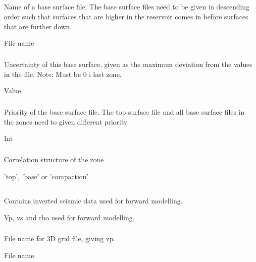 \subparagraph{}
 \slist
   \item \Description Name of a base surface file. The base surface files need to be given in descending order such that surfaces that are higher in the reservoir comes in before surfaces that are further down.
   \item \Argument File name
   \item \Default
 \elist

\subparagraph{}
 \slist
   \item \Description Uncertainty of this base surface, given as the maximum deviation from the values in the file. Note: Must be 0 i last zone.
   \item \Argument Value
 \elist

\subparagraph{}
 \slist
   \item \Description Priority of the base surface file. The top surface file and all base surface files in the zones need to given different priority
   \item \Argument Int
   \item \Default
 \elist

\subparagraph{}
 \slist
   \item \Description Correlation structure of the zone
   \item \Argument 'top', 'base' or 'compaction'
   \item \Default
 \elist

\subsection{}
 \slist
   \item \Description Contains inverted seismic data used for forward modelling.
   \item \Argument Vp, vs and rho used for forward modelling.
   \item \Default
 \elist

\subsubsection{}
 \slist
   \item \Description File name for 3D grid file, giving vp.
   \item \Argument File name
   \item \Default
 \elist


